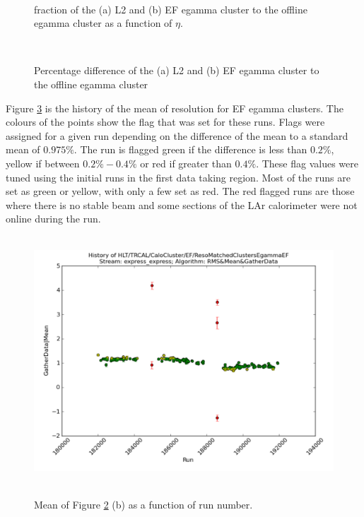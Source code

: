 \begin{figure}
\centering
\mbox{
   \quad
      \quad
}
\caption[\et{} fraction of L2 and EF to offline egamma objects]{\et{} fraction of the (a) L2 and (b) EF egamma cluster to the offline egamma cluster \et{} as a function of $\eta$. \label{SW_egamma_L2EF_EtFrac}}
\end{figure}

\begin{figure}
\centering
\mbox{
   \quad
      \quad
}
\caption[Offline egamma \et{} versus L2/EF egamma \et{}]{Percentage difference of the (a) L2 and (b) EF egamma cluster \et{} to the offline egamma cluster \et{}\label{SW_egamma_L2EF_Reso}}
\end{figure}


Figure \ref{SW_egamma_EF_Reso_Range} is the history of the mean of \et{} resolution for EF egamma clusters.
The colours of the points show the flag that was set for these runs.
Flags were assigned for a given run depending on the difference of the mean to a standard mean of $0.975\%$. 
The run is flagged green if the difference is less than $0.2\%$, yellow if between $0.2\% - 0.4\%$ or red if greater than $0.4\%$.
These flag values were tuned using the initial runs in the first data taking region.
Most of the runs are set as green or yellow, with only a few set as red.
The red flagged runs are those where there is no stable beam and some sections of the LAr calorimeter were not online during the run.


\begin{figure}
\centering
\mbox{
   \includegraphics[width=1.0\textwidth]{figures/ServiceWork/EF_Reso_Range.pdf}
}
\caption[Offline egamma \et{} versus L2/EF egamma \et{}]{Mean of Figure \ref{SW_egamma_L2EF_Reso} (b) as a function of run number. \label{SW_egamma_EF_Reso_Range}}
\end{figure}


